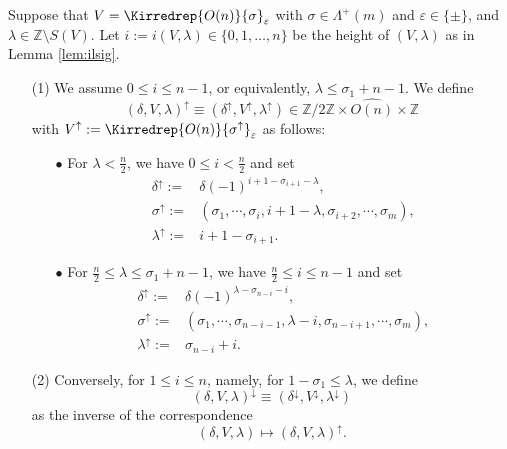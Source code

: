 \begin{definition}
\label{def:180909}
Suppose that 
 $V=\Kirredrep{O(n)}{\sigma}_{\varepsilon}$
 with $\sigma \in \Lambda^+(m)$
 and $\varepsilon \in \{\pm\}$, 
 and $\lambda \in {\mathbb{Z}} 
 \setminus S(V)$.  
Let $i:=i(V,\lambda) \in \{0,1,\ldots,n\}$
 be the height of $(V,\lambda)$
 as in Lemma \ref{lem:ilsig}.  
\begin{enumerate}
\item[{\rm{(1)}}]
We assume $0 \le i \le n-1$, 
 or equivalently, 
 $\lambda \le \sigma_1 +n-1$.  
We define
\begin{equation}
\label{eqn:upVlmd}
 (\delta,V,\lambda)^{\uparrow} \equiv (\delta^{\uparrow},V^{\uparrow},\lambda^{\uparrow})
\in {\mathbb{Z}}/2{\mathbb{Z}} \times \widehat{O(n)} \times {\mathbb{Z}}
\end{equation}
with $V^{\uparrow} := \Kirredrep{O(n)}{\sigma^{\uparrow}}_{\varepsilon}$ 
 as follows:

\begin{enumerate}
\item[$\bullet$]
For $\lambda < \frac n 2$, 
 we have $0 \le i < \frac n2$
 and set
\begin{align*}
\delta^{\uparrow} := & \delta(-1)^{i+1-\sigma_{i+1}-\lambda}, 
\\
\sigma^{\uparrow} := & (\sigma_{1}, \cdots, \sigma_{i}, i+1-\lambda, 
 \sigma_{i+2}, \cdots, \sigma_{m}), 
\\
\lambda^{\uparrow} := & i+1-\sigma_{i+1}.  
\end{align*}
\item[$\bullet$]
For $\frac n 2 \le \lambda \le \sigma_1 +n-1$, 
 we have $\frac n2 \le i \le n-1$
 and set
\begin{align*}
\delta^{\uparrow} := & \delta(-1)^{\lambda-\sigma_{n-i}-i}, 
\\
\sigma^{\uparrow} := & (\sigma_{1}, \cdots, \sigma_{n-i-1}, \lambda-i, 
 \sigma_{n-i+1}, \cdots, \sigma_{m}), 
\\
\lambda^{\uparrow} := & \sigma_{n-i} +i.  
\end{align*}
\end{enumerate}


\item[{\rm{(2)}}]
Conversely,
 for $1 \le i \le n$, 
 namely, 
 for $1-\sigma_1 \le \lambda$, 
 we define
\begin{equation}
\label{eqn:downVlmd}
  (\delta,V,\lambda)^{\downarrow}
  \equiv
  (\delta^{\downarrow},V^{\downarrow},\lambda^{\downarrow})
\end{equation}
 as the inverse of the correspondence
\[
   (\delta,V,\lambda) \mapsto (\delta,V,\lambda)^{\uparrow}.  
\]
\end{enumerate}
\end{definition}

